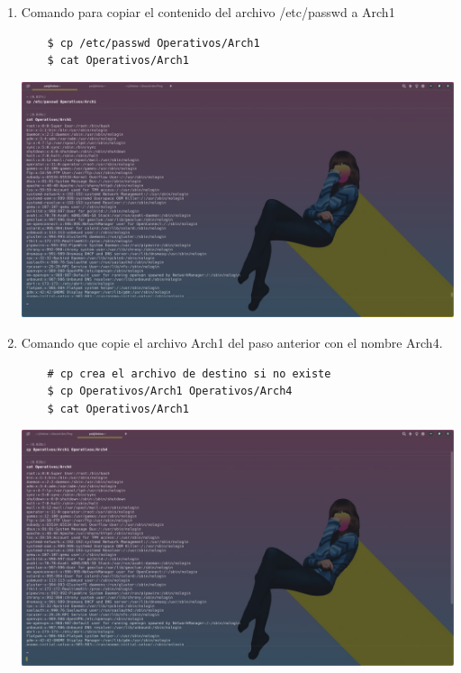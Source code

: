 \documentclass{article}
\begin{document}
\begin{enumerate}
    \item Comando para copiar el contenido del archivo /etc/passwd a Arch1
    
    \begin{verbatim}
    $ cp /etc/passwd Operativos/Arch1
    $ cat Operativos/Arch1
    \end{verbatim}
    
    \includegraphics[scale=0.25,trim={0 25cm 20cm 0},clip]{LinuxCapturas/copy.png} 

    \item Comando que copie el archivo Arch1 del paso anterior con el nombre Arch4.

    \begin{verbatim}
    # cp crea el archivo de destino si no existe
    $ cp Operativos/Arch1 Operativos/Arch4
    $ cat Operativos/Arch1
    \end{verbatim}
    
    \includegraphics[scale=0.25,trim={0 25cm 20cm 0},clip]{LinuxCapturas/copy2.png} 
    
    \\


\end{enumerate}
\end{document}
